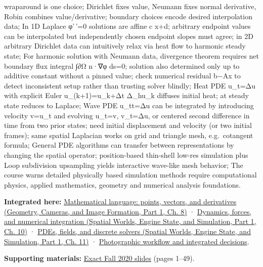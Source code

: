 wraparound is one choice; Dirichlet fixes value, Neumann fixes normal derivative, Robin combines value/derivative; boundary choices encode desired interpolation data; In 1D Laplace φ'\,'=0 solutions are affine c x+d; arbitrary endpoint values can be interpolated but independently chosen endpoint slopes must agree; in 2D arbitrary Dirichlet data can intuitively relax via heat flow to harmonic steady state; For harmonic solution with Neumann data, divergence theorem requires net boundary flux integral ∫∂Ω n·∇φ ds=0; solution also determined only up to additive constant without a pinned value; check numerical residual b−Ax to detect inconsistent setup rather than trusting solver blindly; Heat PDE u\_t=Δu with explicit Euler u\_(k+1)=u\_k+Δt Δ\_hu\_k diffuses initial heat; at steady state reduces to Laplace; Wave PDE u\_tt=Δu can be integrated by introducing velocity v=u\_t and evolving u\_t=v, v\_t=Δu, or centered second difference in time from two prior states; need initial displacement and velocity (or two initial frames); same spatial Laplacian works on grid and triangle mesh, e.g.~cotangent formula; General PDE algorithms can transfer between representations by changing the spatial operator; position-based thin-shell low-res simulation plus Loop subdivision upsampling yields interactive wave-like mesh behavior; The course warns detailed physically based simulation methods require computational physics, applied mathematics, geometry and numerical analysis foundations.

\textbf{Integrated here:} \href{../03-Geometry-Cameras-and-Image-Formation-P01/main.pdf\#03-visual-computing-i-ch001-mathematical-language-points-vectors-and-derivatives}{Mathematical language: points, vectors, and derivatives (Geometry, Cameras, and Image Formation, Part 1, Ch. 8)} · \href{../05-Spatial-Worlds-Engine-State-and-Simulation-P01/main.pdf\#04-visual-computing-ii-ch029-dynamics-forces-and-numerical-integration}{Dynamics, forces, and numerical integration (Spatial Worlds, Engine State, and Simulation, Part 1, Ch. 10)} · \href{../05-Spatial-Worlds-Engine-State-and-Simulation-P01/main.pdf\#04-visual-computing-ii-ch030-pdes-fields-and-discrete-solvers}{PDEs, fields, and discrete solvers (Spatial Worlds, Engine State, and Simulation, Part 1, Ch. 11)} · \hyperref[04-visual-computing-ii-ch034-photographic-workflow-and-integrated-decisions]{Photographic workflow and integrated decisions}.

\textbf{Supporting materials:} \href{https://15462.courses.cs.cmu.edu/fall2020content/lectures/23_pdes/23_pdes_slides.pdf}{Exact Fall 2020 slides} (pages 1--49).

